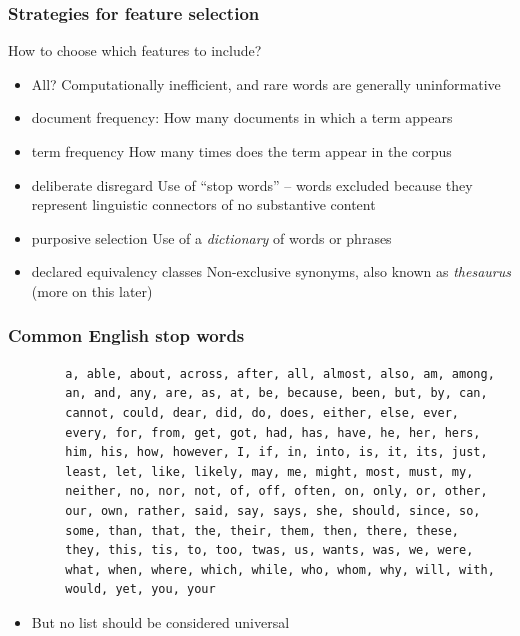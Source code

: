 \documentclass[notes=hide]{beamer}
\begin{document}
\begin{frame}
	\frametitle{Strategies for feature selection}
	How to choose which features to include?
	\begin{itemize} [<+->]
		\item \alert{All?} Computationally inefficient, and rare words are generally uninformative
	\end{itemize}
	\begin{itemize}[<+->]
		\item \alert{document frequency}: How many documents in which a term appears
		\item \alert{term frequency} How many times does the term appear in
		the corpus
		\item \alert{deliberate disregard}  Use of ``stop words'' -- words
		excluded because they represent linguistic connectors of no
		substantive content
		\item \alert{purposive selection} Use of a \emph{dictionary} of words or phrases
		\item \alert{declared equivalency classes} Non-exclusive synonyms,
		also known as \emph{thesaurus} (more on this later)
	\end{itemize}
\end{frame}

\begin{frame}[fragile]
	\frametitle{Common English stop words}
	\begin{small}
		\begin{verbatim}
		a, able, about, across, after, all, almost, also, am, among, 
		an, and, any, are, as, at, be, because, been, but, by, can, 
		cannot, could, dear, did, do, does, either, else, ever, 
		every, for, from, get, got, had, has, have, he, her, hers, 
		him, his, how, however, I, if, in, into, is, it, its, just, 
		least, let, like, likely, may, me, might, most, must, my, 
		neither, no, nor, not, of, off, often, on, only, or, other, 
		our, own, rather, said, say, says, she, should, since, so, 
		some, than, that, the, their, them, then, there, these, 
		they, this, tis, to, too, twas, us, wants, was, we, were, 
		what, when, where, which, while, who, whom, why, will, with, 
		would, yet, you, your 
		\end{verbatim}
	\end{small}
	\begin{itemize}
		\pause \item But no list should be considered universal
	\end{itemize}
\end{frame}
\end{document}
